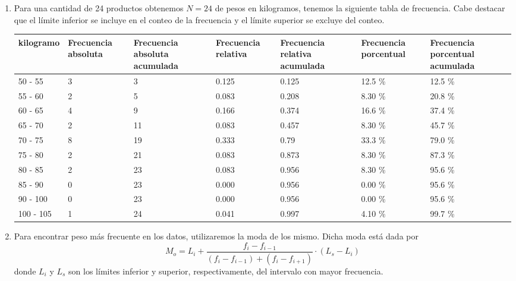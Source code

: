 \begin{solution}
    \begin{enumerate}
        \item Para una cantidad de 24 productos obtenemos $N = 24$ de pesos en kilogramos, tenemos la siguiente tabla de frecuencia.
        Cabe destacar que el límite inferior se incluye en el conteo de la frecuencia y el límite superior se excluye del conteo.
        \begin{table}[H]
            \centering
            \begin{tabular}{|p{1.7cm}|p{1.8cm}|p{2cm}|p{1.8cm}|p{2cm}|p{2cm}|p{2cm}|}
                \hline
                kilogramo & Frecuencia absoluta & Frecuencia absoluta acumulada & Frecuencia relativa & Frecuencia relativa acumulada & Frecuencia porcentual & Frecuencia porcentual acumulada\\
                \hline\hline
                 50 - 55   & 3 &  3 & 0.125 & 0.125 & 12.5 \% & 12.5 \% \\\hline
                 55 - 60   & 2 &  5 & 0.083 & 0.208 & 8.30 \% & 20.8 \% \\\hline
                 60 - 65   & 4 &  9 & 0.166 & 0.374 & 16.6 \% & 37.4 \% \\\hline
                 65 - 70   & 2 & 11 & 0.083 & 0.457 & 8.30 \% & 45.7 \% \\\hline
                 70 - 75   & 8 & 19 & 0.333 & 0.79  & 33.3 \% & 79.0 \% \\\hline
                 75 - 80   & 2 & 21 & 0.083 & 0.873 & 8.30 \% & 87.3 \% \\\hline
                 80 - 85   & 2 & 23 & 0.083 & 0.956 & 8.30 \% & 95.6 \% \\\hline
                 85 - 90   & 0 & 23 & 0.000 & 0.956 & 0.00 \% & 95.6 \% \\\hline
                 90 - 100  & 0 & 23 & 0.000 & 0.956 & 0.00 \% & 95.6 \% \\\hline
                100 - 105  & 1 & 24 & 0.041 & 0.997 & 4.10 \% & 99.7 \% \\\hline
            \end{tabular}
        \end{table}
        \item Para encontrar peso más frecuente en los datos, utilizaremos la moda de los mismo.
        Dicha moda está dada por
        \[
            M_o = L_i + \frac{f_i - f_{i - 1}}{(f_i - f_{i - 1}) + (f_i - f_{i + 1})}\cdot (L_s - L_i)
        \]
        donde $L_i$ y $L_s$ son los límites inferior y superior, respectivamente, del intervalo con mayor frecuencia.

\end{enumerate}
\end{solution}
